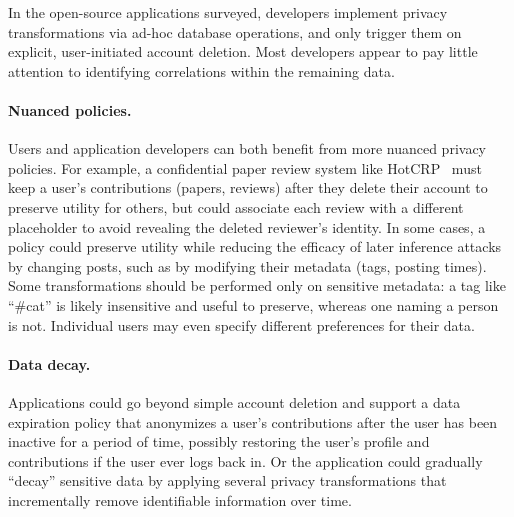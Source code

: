 In the open-source applications surveyed, developers implement privacy transformations
via ad-hoc database operations, and only trigger them on explicit, user-initiated account
deletion.
%
Most developers appear to pay little attention to identifying correlations
within the remaining data.
%


\paragraph{Nuanced policies.}
%
Users and application developers can both benefit from more nuanced privacy policies.
%
For example, a confidential paper review system like HotCRP~\cite{hotcrp} must keep a
user's contributions
(papers, reviews) after they delete their account to preserve utility for others, but could
associate each review with a different placeholder to avoid revealing the deleted reviewer's
identity.
%
In some cases, a policy could preserve utility while reducing the efficacy of later inference
attacks by changing posts, such as by modifying their metadata (\eg tags, posting times).
%
Some transformations should be performed only on sensitive metadata:
a tag like “\#cat” is likely insensitive and useful to preserve, whereas one naming a person is not.
%
%
Individual users may even specify different preferences for their data.
%
%

\paragraph{Data decay.}
%
Applications could go beyond simple account deletion and support a data expiration policy that
anonymizes a user's contributions after the user has been inactive for a period of time,
possibly restoring the user's profile and contributions if the user ever logs back in.
%
Or the application could gradually ``decay'' sensitive data by applying several privacy
transformations that incrementally remove identifiable information over time.
%

